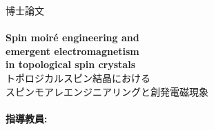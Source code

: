 \begin{titlepage}
\center
{\LARGE 博士論文}\\[1.5cm]
\HRule \\[0.6cm]
\fontsize{22pt}{24pt}\selectfont
{\bf
Spin moir\'e engineering and \\
emergent electromagnetism\\ 
in topological spin crystals
}
\\[0.6cm]
{\fontsize{16pt}{18pt}\selectfont
トポロジカルスピン結晶における\\
スピンモアレエンジニアリングと創発電磁現象
}
\\[0.3cm]
\HRule \\[1.5cm]
\Large {\bf 指導教員:}\\

\end{titlepage}
